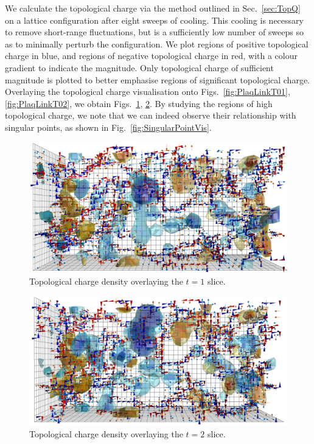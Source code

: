 We calculate the topological charge via the method outlined in Sec.~\ref{sec:TopQ} on a lattice configuration after eight sweeps of cooling. This cooling is necessary to remove short-range fluctuations, but is a sufficiently low number of sweeps so as to minimally perturb the configuration. We plot regions of positive topological charge in blue, and regions of negative topological charge in red, with a colour gradient to indicate the magnitude. Only topological charge of sufficient magnitude is plotted to better emphasise regions of significant topological charge. Overlaying the topological charge visualisation onto Figs.~\ref{fig:PlaqLinkT01}, \ref{fig:PlaqLinkT02}, we obtain Figs.~\ref{fig:PlaqLinkQT01}, \ref{fig:PlaqLinkQT02}. By studying the regions of high topological charge, we note that we can indeed observe their relationship with singular points, as shown in Fig.~\ref{fig:SingularPointVis}.\\
%
\begin{figure}
\centering
\includegraphics[width=\linewidth]{./PlaqLinkTopQ_CFG95_T01.png}
\caption{\label{fig:PlaqLinkQT01}Topological charge density overlaying the $t=1$ slice.}
\end{figure}
%
\begin{figure}
\centering
\includegraphics[width=\linewidth]{./PlaqLinkTopQ_CFG95_T02.png}
\caption{\label{fig:PlaqLinkQT02}Topological charge density overlaying the $t=2$ slice.}
\end{figure}
